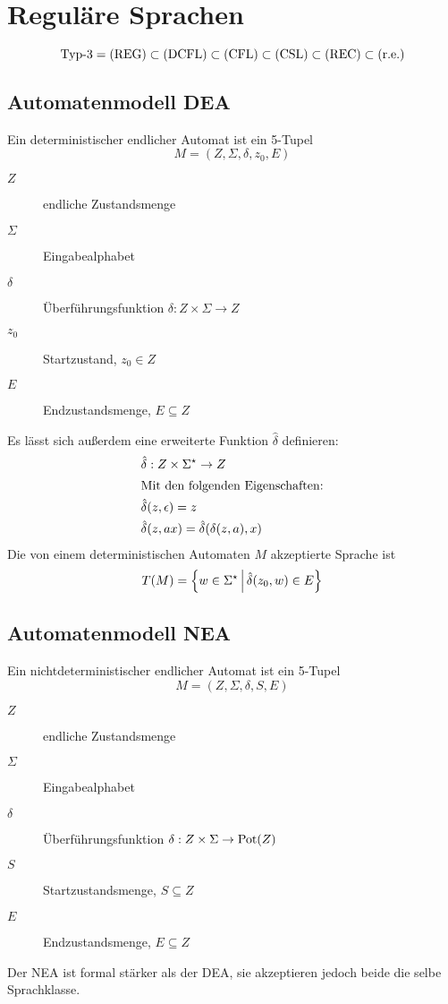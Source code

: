 \chapter{Reguläre Sprachen}
\begin{equation*}
	\text{Typ-3} = \mathrm{(REG)}\subset\mathrm{(DCFL)}\subset\mathrm{(CFL)}\subset\mathrm{(CSL)}\subset\mathrm{(REC)}\subset\mathrm{(r.e.)}
\end{equation*}

\section{Automatenmodell DEA}
Ein deterministischer endlicher Automat ist ein 5-Tupel
\begin{equation*}
	M=(Z,\Sigma,\delta,z_0,E)
\end{equation*}
\begin{description}
	\item[$Z$] endliche Zustandsmenge
	\item[$\Sigma$] Eingabealphabet
	\item[$\delta$] Überführungsfunktion $\delta:Z\times\Sigma\rightarrow Z$
	\item[$z_0$] Startzustand, $z_0\in Z$
	\item[$E$] Endzustandsmenge, $E\subseteq Z$
\end{description}
\bigskip
Es lässt sich außerdem eine erweiterte Funktion $\hat\delta$ definieren:
\begin{align*}
	&\hat\delta:Z\times\Sigma^\star\rightarrow Z\\
	\intertext{Mit den folgenden Eigenschaften:}
	&\hat\delta(z,\epsilon)=z\\
	&\hat\delta(z,ax)=\hat\delta(\delta(z,a),x)
\end{align*}
Die von einem deterministischen Automaten $M$ akzeptierte Sprache ist
\begin{equation*}
	T(M)=\left\{ w\in\Sigma^\star \,\middle|\, \hat\delta(z_0,w)\in E \right\}
\end{equation*}

\section{Automatenmodell NEA}\label{reg:nea}
Ein nichtdeterministischer endlicher Automat ist ein 5-Tupel
\begin{equation*}
	M=(Z,\Sigma,\delta,S,E)
\end{equation*}
\begin{description}
	\item[$Z$] endliche Zustandsmenge
	\item[$\Sigma$] Eingabealphabet
	\item[$\delta$] Überführungsfunktion $\delta:Z\times\Sigma\rightarrow \mathrm{Pot}(Z)$
	\item[$S$] Startzustandsmenge, $S\subseteq Z$
	\item[$E$] Endzustandsmenge, $E\subseteq Z$
\end{description}
Der NEA ist formal stärker als der DEA, sie akzeptieren jedoch beide die selbe Sprachklasse.

